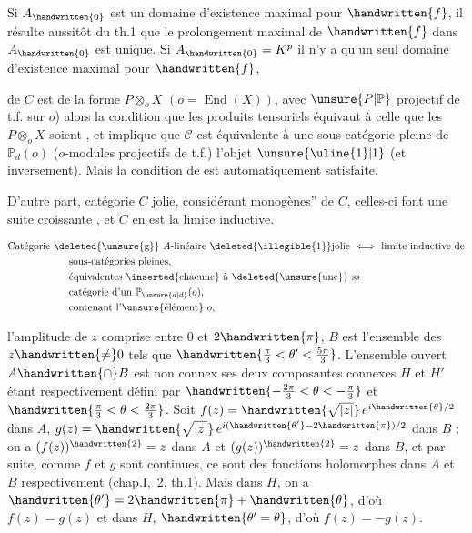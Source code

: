Si $A_{\handwritten{0}}$ est un domaine d'existence maximal pour $\handwritten{f}$, il résulte aussitôt du th.1 que le prolongement maximal de $\handwritten{f}$ dans $A_{\handwritten{0}}$ est \uline{unique}. Si $A_{\handwritten{0}}=K^p$ il n'y a qu'un seul domaine d'existence maximal pour $\handwritten{f}$,


de $C$ est de la forme $P\otimes_o X$ $(o=\operatorname{End}(X))$, avec $\unsure{P|\mathbb{P}}$ projectif de t.f. sur $o$) alors la condition que les produits tensoriels   équivaut à celle que  les $P\otimes_o X$ soient , et implique que $\mathcal{C}$ est équivalente à une sous-catégorie pleine de $\mathbb{P}_d(o)$ ($o$-modules  projectifs de t.f.)   l'objet $\unsure{\uline{1}|1}$ (et inversement). Mais la condition de  est automatiquement satisfaite.

D'autre part,  catégorie  $C$ jolie, considérant  monogènes'' de $C$, celles-ci font une suite croissante , et $C$ en est la limite inductive.

\[
\begin{aligned}
&\text{Catégorie }\deleted{\text{\unsure{g}}}\ A\text{-linéaire }\deleted{\text{\illegible{1}}}\text{jolie}\ \Longleftrightarrow\ \text{limite inductive de}\\
&\qquad\qquad\qquad\text{sous-catégories pleines,}\\
&\qquad\qquad\qquad\text{équivalentes}\ \inserted{\text{chacune}}\ \text{à}\ \deleted{\text{\unsure{une}}}\ \text{ss}\\
&\qquad\qquad\qquad\text{catégorie d'un }\mathbb{P}_{\unsure{a|d}}(o),\\
&\qquad\qquad\qquad\text{contenant l'\unsure{élément} }o,
\end{aligned}
\]
\margin{(}


l'amplitude de $z$ comprise entre $0$ et $2\handwritten{\pi}$, $B$ est l'ensemble des $z\handwritten{\neq}0$ tels que $\handwritten{\frac{\pi}{3}<\theta'<\frac{5\pi}{3}}$. L'ensemble ouvert $A\handwritten{\cap}B$ est non connex ses deux composantes connexes $H$ et $H'$ étant respectivement défini par $\handwritten{-\frac{2\pi}{3}<\theta<-\frac{\pi}{3}}$ et $\handwritten{\frac{\pi}{3}<\theta<\frac{2\pi}{3}}$. Soit $f(z)=\handwritten{\sqrt{|z|}}\,e^{i\handwritten{\theta}/2}$ dans $A$, $g(z)=\handwritten{\sqrt{|z|}}\,e^{i(\handwritten{\theta'}-2\handwritten{\pi})/2}$ dans $B$ ; on a $(f(z))^{\handwritten{2}}=z$ dans $A$ et $(g(z))^{\handwritten{2}}=z$ dans $B$, et par suite, comme $f$ et $g$ sont continues, ce sont des fonctions holomorphes dans $A$ et $B$ respectivement (chap.I, \handwritten{\S}\,2, th.1). Mais dans $H$, on a $\handwritten{\theta'}=2\handwritten{\pi}+\handwritten{\theta}$, d'où $f(z)=g(z)$ et dans $H$, $\handwritten{\theta'=\theta}$, d'où $f(z)=-g(z)$.

